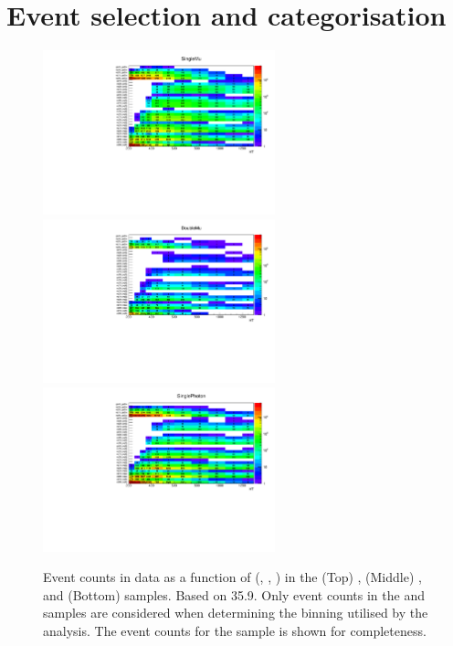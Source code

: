 \section{Event selection and categorisation}
\label{app:selection}

\begin{figure}[h!]
  \begin{center}
    {\includegraphics[width=0.6\textwidth]{figures/control_regions/SingleMu.pdf}} 
    {\includegraphics[width=0.6\textwidth]{figures/control_regions/DoubleMu.pdf}}
    {\includegraphics[width=0.6\textwidth]{figures/control_regions/SinglePhoton.pdf}}
    \caption{Event counts in data as a function of (\njet, \nb,
      \scalht) in the (Top) \mj, (Middle) \mmj, and (Bottom) \gj
      samples. Based on 35.9\fbinv. Only event counts in the \mj and
      \mmj samples are considered when determining the binning
      utilised by the analysis. The event counts for the \gj sample is
      shown for completeness.} 
    \label{fig:cr-counts}
  \end{center}
\end{figure}
